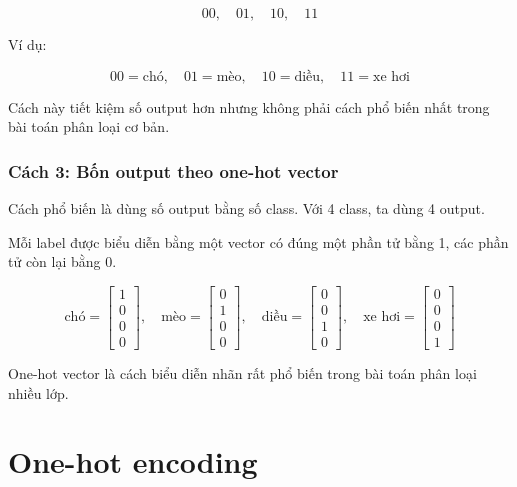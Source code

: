 \documentclass[12pt,a4paper]{report}
\begin{document}
\[
    00,\quad 01,\quad 10,\quad 11
\]

Ví dụ:

\[
    00 = \text{chó}, \quad
    01 = \text{mèo}, \quad
    10 = \text{diều}, \quad
    11 = \text{xe hơi}
\]

Cách này tiết kiệm số output hơn nhưng không phải cách phổ biến nhất trong bài toán phân loại cơ bản.

\subsection{Cách 3: Bốn output theo one-hot vector}

Cách phổ biến là dùng số output bằng số class. Với 4 class, ta dùng 4 output.

Mỗi label được biểu diễn bằng một vector có đúng một phần tử bằng 1, các phần tử còn lại bằng 0.

\[
    \text{chó} =
    \begin{bmatrix}
    1\\0\\0\\0
    \end{bmatrix},
    \quad
    \text{mèo} =
    \begin{bmatrix}
    0\\1\\0\\0
    \end{bmatrix},
    \quad
    \text{diều} =
    \begin{bmatrix}
    0\\0\\1\\0
    \end{bmatrix},
    \quad
    \text{xe hơi} =
    \begin{bmatrix}
    0\\0\\0\\1
    \end{bmatrix}
\]

\begin{ghinho}
One-hot vector là cách biểu diễn nhãn rất phổ biến trong bài toán phân loại nhiều lớp.
\end{ghinho}

\chapter{One-hot encoding}
\end{document}
